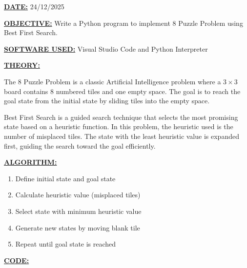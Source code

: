 \documentclass[12pt,a4paper]{article}
\begin{document}
\textbf{\underline{DATE:}} 24/12/2025

\vspace{0.5cm}
\textbf{\underline{OBJECTIVE:}} Write a Python program to implement 8 Puzzle Problem using Best First Search.

\vspace{0.5cm}
\textbf{\underline{SOFTWARE USED:}} Visual Studio Code and Python Interpreter

\vspace{0.5cm}
\textbf{\underline{THEORY:}}

The 8 Puzzle Problem is a classic Artificial Intelligence problem where a $3\times3$ board contains 8 numbered tiles and one empty space. The goal is to reach the goal state from the initial state by sliding tiles into the empty space.

Best First Search is a guided search technique that selects the most promising state based on a heuristic function. In this problem, the heuristic used is the number of misplaced tiles. The state with the least heuristic value is expanded first, guiding the search toward the goal efficiently.

\vspace{0.5cm}
\textbf{\underline{ALGORITHM:}}
\begin{enumerate}
  \item Define initial state and goal state
  \item Calculate heuristic value (misplaced tiles)
  \item Select state with minimum heuristic value
  \item Generate new states by moving blank tile
  \item Repeat until goal state is reached
\end{enumerate}

\vspace{0.5cm}
\textbf{\underline{CODE:}}
\end{document}

